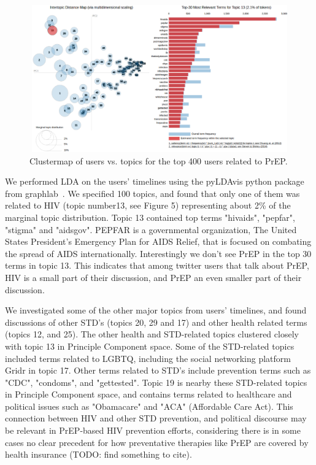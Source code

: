 \documentclass{sig-alternate-05-2015}
\begin{document}
\begin{figure}
\centering
\includegraphics[height=2.5in, width=4.5in]{LDA_user_timelines}
\caption{Clustermap of users vs. topics for the top 400 users related to PrEP.}
\end{figure}

We performed LDA on the users' timelines using the pyLDAvis python package from graphlab~\cite{low2014graphlab}. We specified 100 topics, and found that only one of them was related to HIV (topic number13, see Figure 5) representing about 2\% of the marginal topic distribution. Topic 13 contained top terms "hivaids", "pepfar", "stigma" and "aidsgov". PEPFAR is a governmental organization, The United States President's Emergency Plan for AIDS Relief, that is focused on combating the spread of AIDS internationally. Interestingly we don't see PrEP in the top 30 terms in topic 13. This indicates that among twitter users that talk about PrEP, HIV is a small part of their discussion, and PrEP an even smaller part of their discussion.

We investigated some of the other major topics from users' timelines, and found discussions of other STD's (topics 20, 29 and 17) and other health related terms (topics 12, and 25). The other health and STD-related topics clustered closely with topic 13 in Principle Component space. Some of the STD-related topics included terms related to LGBTQ, including the social networking platform Gridr in topic 17. Other terms related to STD's include prevention terms such as "CDC", "condoms", and "gettested". Topic 19 is nearby these STD-related topics in Principle Component space, and contains terms related to healthcare and political issues such as "Obamacare" and "ACA" (Affordable Care Act). This connection between HIV and other STD prevention, and political discourse may be relevant in PrEP-based HIV prevention efforts, considering there is in some cases no clear precedent for how preventative therapies like PrEP are covered by health insurance (TODO: find something to cite).
\end{document}

